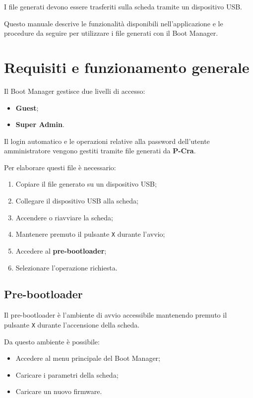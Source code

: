\documentclass[11pt,a4paper]{article}
\newcommand{\software}{\textbf{P-Cra}}
\begin{document}
I file generati devono essere trasferiti sulla scheda tramite
un dispositivo USB.

Questo manuale descrive le funzionalità disponibili nell'applicazione
e le procedure da seguire per utilizzare i file generati con il
Boot Manager.

\section{Requisiti e funzionamento generale}

Il Boot Manager gestisce due livelli di accesso:

\begin{itemize}
    \item \textbf{Guest};
    \item \textbf{Super Admin}.
\end{itemize}

Il login automatico e le operazioni relative alla password
dell'utente amministratore vengono gestiti tramite file generati
da \software.

Per elaborare questi file è necessario:

\begin{enumerate}
    \item Copiare il file generato su un dispositivo USB;
    \item Collegare il dispositivo USB alla scheda;
    \item Accendere o riavviare la scheda;
    \item Mantenere premuto il pulsante \texttt{X} durante l'avvio;
    \item Accedere al \textbf{pre-bootloader};
    \item Selezionare l'operazione richiesta.
\end{enumerate}

\subsection{Pre-bootloader}

Il pre-bootloader è l'ambiente di avvio accessibile mantenendo
premuto il pulsante \texttt{X} durante l'accensione della scheda.

Da questo ambiente è possibile:

\begin{itemize}
    \item Accedere al menu principale del Boot Manager;
    \item Caricare i parametri della scheda;
    \item Caricare un nuovo firmware.
\end{itemize}
\end{document}
